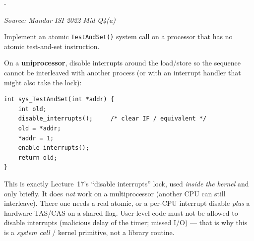 \documentclass[11pt,a4paper]{article}
\makeatletter
\newcommand{\keepspace}[1]{\par\penalty-100\begingroup
  \setlength{\dimen@}{#1}\dimen@ii\pagegoal\advance\dimen@ii-\pagetotal
  \ifdim\dimen@>\dimen@ii\ifdim\dimen@ii>\z@\vfil\fi\break\fi\endgroup}
\newcounter{qn}[section]
\newenvironment{Qn}[4]{%
  \refstepcounter{qn}\keepspace{7\baselineskip}%
  \begin{tcolorbox}[qboxstyle, title={Q\thesection.\theqn\ \ [#1 \textbar\ #2]\ \ #4}]%
  {\footnotesize\color{g3}\textit{Source: #3}}\par\smallskip%
}{%
  \end{tcolorbox}%
}
\newenvironment{Sol}{%
  \begin{tcolorbox}[sboxstyle, title={Solution}]%
}{%
  \end{tcolorbox}\vspace{0.35em}%
}
\makeatother
\begin{document}
\begin{Qn}{Medium-Hard}{Lect 17}{Mandar ISI 2022 Mid Q4(a)}{TAS in a kernel whose CPU has no TAS instruction}
Implement an atomic \texttt{TestAndSet()} system call on a processor that has no atomic test-and-set instruction.
\end{Qn}
\begin{Sol}
On a \textbf{uniprocessor}, disable interrupts around the load/store so the sequence cannot be interleaved with another process (or with an interrupt handler that might also take the lock):

\begin{lstlisting}[numbers=none]
int sys_TestAndSet(int *addr) {
    int old;
    disable_interrupts();     /* clear IF / equivalent */
    old = *addr;
    *addr = 1;
    enable_interrupts();
    return old;
}
\end{lstlisting}

This is exactly Lecture~17's ``disable interrupts'' lock, used \emph{inside the kernel} and only briefly. It does \emph{not} work on a multiprocessor (another CPU can still interleave). There one needs a real atomic, or a per-CPU interrupt disable \emph{plus} a hardware TAS/CAS on a shared flag. User-level code must not be allowed to disable interrupts (malicious delay of the timer; missed I/O) --- that is why this is a \emph{system call} / kernel primitive, not a library routine.
\end{Sol}
\end{document}
